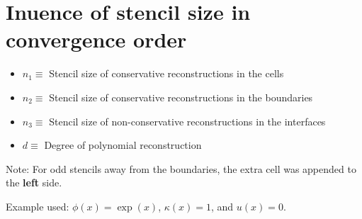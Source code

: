 \documentclass[11pt,a4paper]{article}
\author{}
\title{}
\begin{document}
\section{Inuence of stencil size in convergence order}
\begin{itemize}
\item $n_1\equiv$ Stencil size of conservative reconstructions in the cells
\item $n_2\equiv$ Stencil size of conservative reconstructions in the boundaries
\item $n_3\equiv$ Stencil size of non-conservative reconstructions in the interfaces
\item $d\equiv$ Degree of polynomial reconstruction
\end{itemize}

Note: For odd stencils away from the boundaries, the extra cell was appended to the \textbf{left} side.

Example used: $\phi(x)=\exp(x)$, $\kappa(x)=1$, and $u(x)=0$.

















\end{document}
